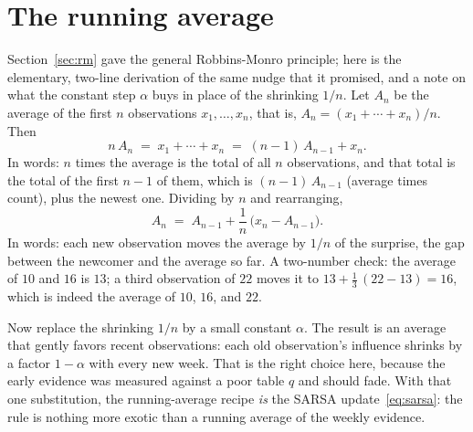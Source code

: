 \documentclass[11pt,a4paper]{article}
\theoremstyle{definition}
\theoremstyle{remark}
\numberwithin{equation}{section}
\begin{document}
\appendix

\section{The running average}\label{app:runavg}

Section~\ref{sec:rm} gave the general Robbins-Monro principle; here is the elementary, two-line
derivation of the same nudge that it promised, and a note on what the constant step
$\alpha$ buys in place of the shrinking $1/n$. Let $A_n$ be the average of the first
$n$ observations $x_1, \dots, x_n$, that is, $A_n = (x_1 + \cdots + x_n)/n$. Then
\[
n\,A_n \;=\; x_1 + \cdots + x_n \;=\; (n-1)\,A_{n-1} + x_n.
\]
In words: $n$ times the average is the total of all $n$ observations, and that total is
the total of the first $n-1$ of them, which is $(n-1)\,A_{n-1}$ (average times count),
plus the newest one. Dividing by $n$ and rearranging,
\[
A_n \;=\; A_{n-1} + \frac{1}{n}\,\bigl(x_n - A_{n-1}\bigr).
\]
In words: each new observation moves the average by $1/n$ of the surprise, the gap between
the newcomer and the average so far. A two-number check: the average of $10$ and $16$ is
$13$; a third observation of $22$ moves it to $13 + \tfrac{1}{3}\,(22 - 13) = 16$, which
is indeed the average of $10$, $16$, and $22$.

Now replace the shrinking $1/n$ by a small constant $\alpha$. The result is an average
that gently favors recent observations: each old observation's influence shrinks by a
factor $1 - \alpha$ with every new week. That is the right choice here, because the early
evidence was measured against a poor table $q$ and should fade. With that one
substitution, the running-average recipe \emph{is} the SARSA update~\eqref{eq:sarsa}: the
rule is nothing more exotic than a running average of the weekly evidence.
\end{document}
